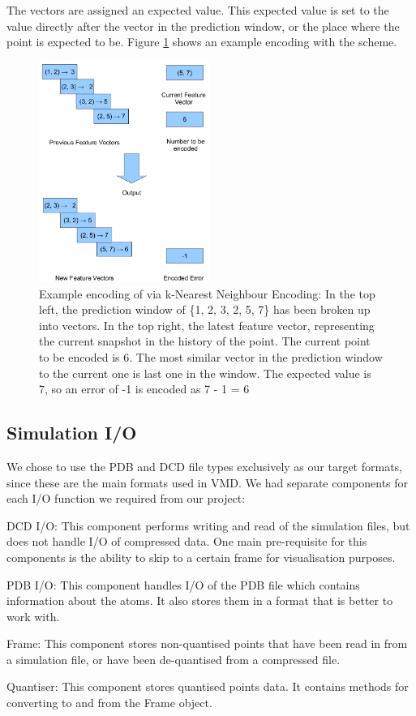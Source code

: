 \documentclass[a4paper,11pt]{report}
\begin{document}
The vectors are assigned an expected value. This expected value is set to the value directly after the vector in the prediction window, or the place where the point is expected to be. Figure \ref{kNNDescrip} shows an example encoding with the scheme.

\begin{figure}
 \center
 \includegraphics[width=0.5\textwidth]{resources/NN.png}
\caption{Example encoding of via k-Nearest Neighbour Encoding: In the top left, the prediction window of \{1, 2, 3, 2, 5, 7\} has been broken up into vectors. In the top right, the latest feature vector, representing the current snapshot in the history of the point. The current point to be encoded is 6. The most similar vector in the prediction window to the current one is last one in the window. The expected value is 7, so an error of -1 is encoded as 7 - 1 = 6}
\label{kNNDescrip}
\end{figure}

\subsection{Simulation I/O}

We chose to use the PDB and DCD file types exclusively as our target formats, since these are the main formats used in VMD. We had separate components for each I/O function we required from our project:

\begin{description}
 \item DCD I/O: This component performs writing and read of the simulation files, but does not handle I/O of compressed data. One main pre-requisite for this components is the ability to skip to a certain frame for visualisation purposes.
 \item PDB I/O: This component handles I/O of the PDB file which contains information about the atoms. It also stores them in a format that is better to work with.
 \item Frame: This component stores non-quantised points that have been read in from a simulation file, or have been de-quantised from a compressed file.
 \item Quantiser: This component stores quantised points data. It contains methods for converting to and from the Frame object.
\end{description}
\end{document}
